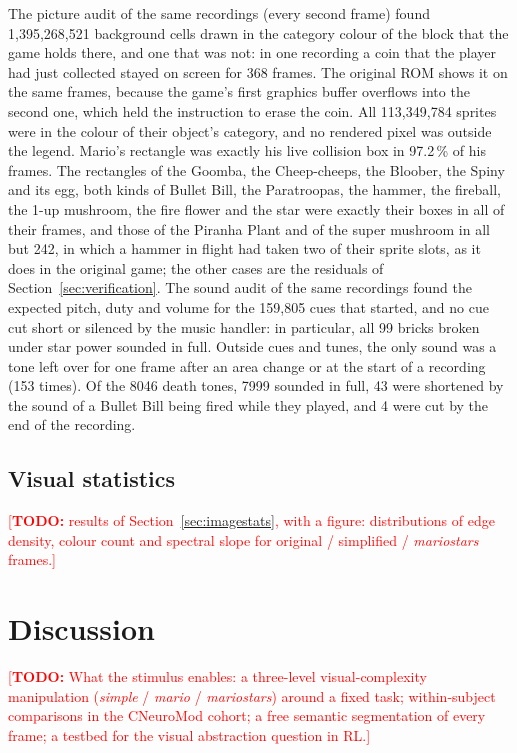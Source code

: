 \documentclass{article}
\newcommand{\TODO}[1]{\textcolor{red}{[\textbf{TODO:} #1]}}
\begin{document}
The picture audit of the same recordings (every second frame) found 1{,}395{,}268{,}521 background
cells drawn in the category colour of the block that the game holds there, and one that was not:
in one recording a coin that the player had just collected stayed on screen for 368 frames. The
original ROM shows it on the same frames, because the game's first graphics buffer overflows
into the second one, which held the instruction to erase the coin. All 113{,}349{,}784 sprites
were in the colour of their object's category, and no rendered pixel was outside the legend.
Mario's rectangle was exactly his live collision box in 97.2\,\% of his frames. The
rectangles of the Goomba, the Cheep-cheeps, the Bloober, the Spiny and its egg, both kinds of
Bullet Bill, the Paratroopas, the hammer, the fireball, the 1-up mushroom, the fire flower and
the star were exactly their boxes in all of their frames, and those of the Piranha Plant and of
the super mushroom in all but 242, in which a hammer in flight had taken two of their
sprite slots, as it does in the original game; the other cases are the residuals of
Section~\ref{sec:verification}. The sound audit of the same recordings found the expected
pitch, duty and volume for the 159{,}805 cues that started, and no cue cut short or silenced by
the music handler: in particular, all 99 bricks broken under star power
sounded in full. Outside cues and tunes, the only sound was a tone left over for one frame after
an area change or at the start of a recording (153 times). Of the 8046 death
tones, 7999 sounded in full, 43 were shortened by the sound of a
Bullet Bill being fired while they played, and 4 were cut by the end of the
recording.

\subsection{Visual statistics}

\TODO{results of Section~\ref{sec:imagestats}, with a figure: distributions of edge density,
colour count and spectral slope for original / simplified / \textit{mariostars} frames.}


\section{Discussion}
\label{sec:discussion}

\TODO{What the stimulus enables: a three-level visual-complexity manipulation
(\textit{simple} / \textit{mario} / \textit{mariostars}) around a fixed task; within-subject
comparisons in the CNeuroMod cohort; a free semantic segmentation of every frame; a testbed for
the visual abstraction question in RL.}
\end{document}

